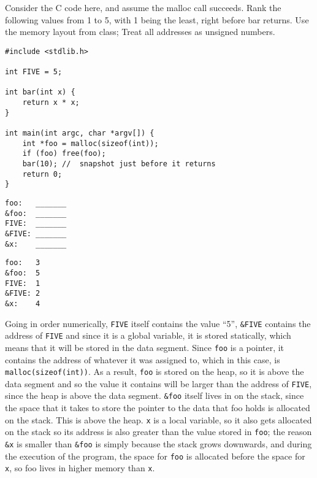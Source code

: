 \begin{blocksection}
\question
Consider the C code here, and assume the malloc call succeeds. Rank the following values from 1 to 5, with 1 being the least, right before bar returns.  Use the memory layout from class;  Treat all addresses as unsigned numbers. 

\begin{verbatim}
#include <stdlib.h> 

int FIVE = 5;

int bar(int x) {
    return x * x;
}

int main(int argc, char *argv[]) { 	
    int *foo = malloc(sizeof(int)); 	
    if (foo) free(foo); 	
    bar(10); //  snapshot just before it returns 	
    return 0; 
}
\end{verbatim}

\begin{verbatim}
foo:   _______
&foo:  _______
FIVE:  _______
&FIVE: _______
&x:    _______
\end{verbatim}

\begin{solution}
\begin{verbatim}
foo:   3
&foo:  5
FIVE:  1
&FIVE: 2
&x:    4
\end{verbatim}

Going in order numerically, \lstinline$FIVE$ itself contains the value “5”, \lstinline$&FIVE$ contains the address of \lstinline$FIVE$ and since it is a global variable, it is stored statically, which means that it will be stored in the data segment. Since \lstinline$foo$ is a pointer, it contains the address of whatever it was assigned to, which in this case, is \lstinline$malloc(sizeof(int))$. As a result, \lstinline$foo$ is stored on the heap, so it is above the data segment and so the value it contains will be larger than the address of \lstinline$FIVE$, since the heap is above the data segment. \lstinline$&foo$ itself lives in on the stack, since the space that it takes to store the pointer to the data that foo holds is allocated on the stack. This is above the heap. \lstinline$x$ is a local variable, so it also gets allocated on the stack so its address is also greater than the value stored in \lstinline$foo$; the reason \lstinline$&x$ is smaller than \lstinline$&foo$ is simply because the stack grows downwards, and during the execution of the program, the space for \lstinline$foo$ is allocated before the space for \lstinline$x$, so foo lives in higher memory than \lstinline$x$.
\end{solution}

\end{blocksection}